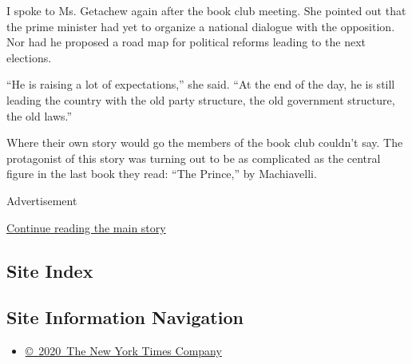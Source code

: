 I spoke to Ms. Getachew again after the book club meeting. She pointed
out that the prime minister had yet to organize a national dialogue with
the opposition. Nor had he proposed a road map for political reforms
leading to the next elections.

``He is raising a lot of expectations,'' she said. ``At the end of the
day, he is still leading the country with the old party structure, the
old government structure, the old laws.''

Where their own story would go the members of the book club couldn't
say. The protagonist of this story was turning out to be as complicated
as the central figure in the last book they read: ``The Prince,'' by
Machiavelli.

Advertisement

\protect\hyperlink{after-bottom}{Continue reading the main story}

\hypertarget{site-index}{%
\subsection{Site Index}\label{site-index}}

\hypertarget{site-information-navigation}{%
\subsection{Site Information
Navigation}\label{site-information-navigation}}

\begin{itemize}
\tightlist
\item
  \href{https://help.nytimes3xbfgragh.onion/hc/en-us/articles/115014792127-Copyright-notice}{©~2020~The
  New York Times Company}
\end{itemize}

